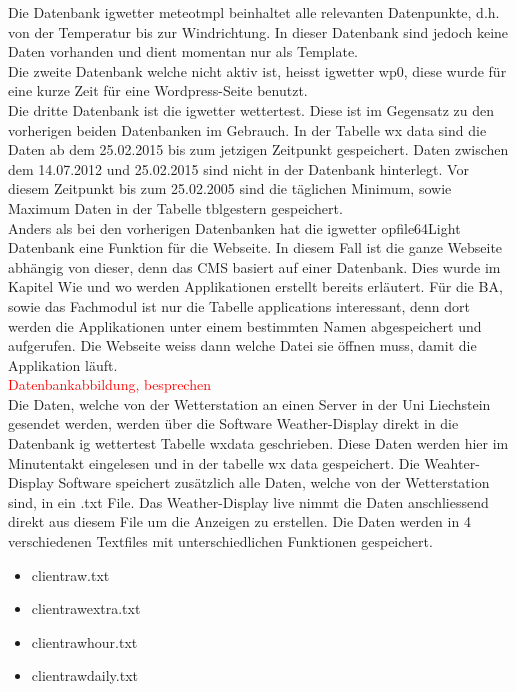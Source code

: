\documentclass[a4paper,ngerman, 11pt, pagesize]{report}
\newcommand\Diskussionspunkt[1]{\textcolor{red}{#1}}
\begin{document}
Die Datenbank igwetter meteotmpl beinhaltet alle relevanten Datenpunkte, d.h. von der Temperatur bis zur Windrichtung. In dieser Datenbank sind jedoch keine Daten vorhanden und dient momentan nur als Template.\\
Die zweite Datenbank welche nicht aktiv ist, heisst igwetter wp0, diese wurde für eine kurze Zeit für eine Wordpress-Seite benutzt.\\
Die dritte Datenbank ist die igwetter wettertest. Diese ist im Gegensatz zu den vorherigen beiden Datenbanken im Gebrauch. In der Tabelle wx data sind die Daten ab dem 25.02.2015 bis zum jetzigen Zeitpunkt gespeichert. Daten zwischen dem 14.07.2012 und 25.02.2015 sind nicht in der Datenbank hinterlegt. Vor diesem Zeitpunkt bis zum 25.02.2005 sind die täglichen Minimum, sowie Maximum Daten in der Tabelle tblgestern gespeichert.\\
Anders als bei den vorherigen Datenbanken hat die igwetter opfile64Light Datenbank eine Funktion für die Webseite. In diesem Fall ist die ganze Webseite abhängig von dieser, denn das CMS basiert auf einer Datenbank. Dies wurde im Kapitel Wie und wo werden Applikationen erstellt bereits erläutert. Für die BA, sowie das Fachmodul ist nur die Tabelle applications interessant, denn dort werden die Applikationen unter einem bestimmten Namen abgespeichert und aufgerufen. Die Webseite weiss dann welche Datei sie öffnen muss, damit die Applikation läuft.\\
\Diskussionspunkt{Datenbankabbildung, besprechen}\\

Die Daten, welche von der Wetterstation an einen Server in der Uni Liechstein gesendet werden, werden über die Software Weather-Display direkt in die Datenbank ig wettertest Tabelle wxdata geschrieben. Diese Daten werden hier im Minutentakt eingelesen und in der tabelle wx data gespeichert. Die Weahter-Display Software speichert zusätzlich alle Daten, welche von der Wetterstation sind, in ein .txt File. Das Weather-Display live nimmt die Daten anschliessend direkt aus diesem File um die Anzeigen zu erstellen. Die Daten werden in 4 verschiedenen Textfiles mit unterschiedlichen Funktionen gespeichert.
\begin{itemize}  
\item clientraw.txt
\item clientrawextra.txt
\item clientrawhour.txt
\item clientrawdaily.txt
\end{itemize}
\end{document}
